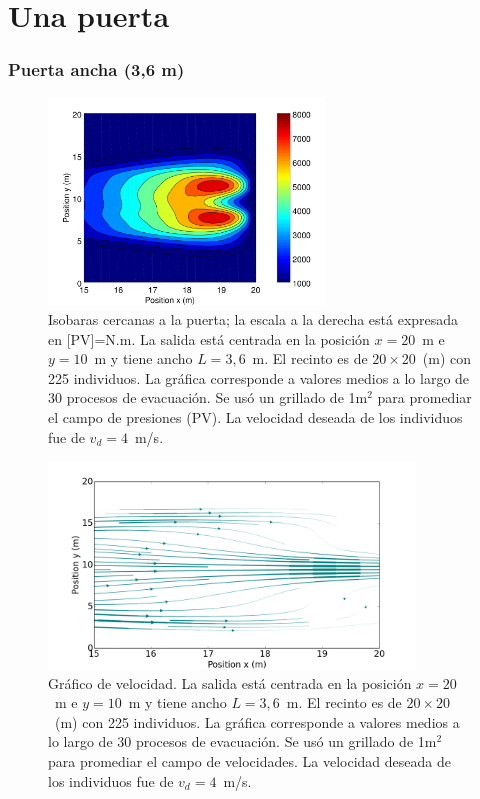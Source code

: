 \section{Una puerta}

\subsubsection{Puerta ancha (3,6 m)}

\begin{figure}[H]
    \centering
    \includegraphics[height=5.5cm]{figuras/press_225p_v4_onedoor_3_6.png}
    \caption[width=5cm]{Isobaras cercanas a la puerta; la escala a la derecha está expresada en [PV]=N.m. La salida está centrada en la posición $x=20$~m e $y=10$~m y tiene ancho $L=3,6$~m. El recinto es de $20\times 20$~(m) con 225 individuos. La gráfica corresponde a valores medios a lo largo de 30 procesos de evacuación. Se usó un grillado de 1m$^2$ para promediar el campo de presiones (PV). La velocidad deseada de los individuos fue de $v_d=4$~m/s.}
    \label{isobaras_3_6m}
\end{figure}

\begin{figure}[H]
    \centering
    \includegraphics[height=5.5cm]{figuras/flujo_door_3_6m.png}
    \caption[width=5cm]{Gráfico de velocidad. La salida está centrada en la posición $x=20$~m e $y=10$~m y tiene ancho $L=3,6$~m. El recinto es de $20\times 20$~(m) con 225 individuos. La gráfica corresponde a valores medios a lo largo de 30 procesos de evacuación. Se usó un grillado de 1m$^2$ para promediar el campo de velocidades. La velocidad deseada de los individuos fue de $v_d=4$~m/s.}
    \label{sintesis}
\end{figure}

